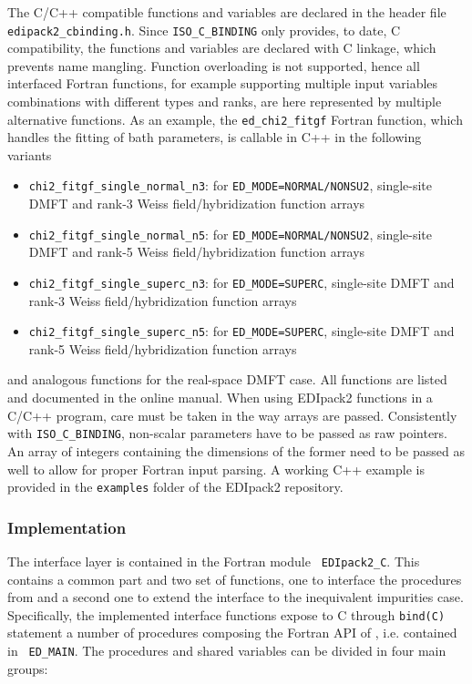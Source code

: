 \documentclass[edipack2.tex]{subfiles}
\begin{document}
The C/C++ compatible functions and variables 
are declared in the header file  {\tt edipack2\_cbinding.h}.
Since {\tt ISO\_C\_BINDING} only provides, to date, C compatibility, the 
functions and variables are declared with C linkage, which prevents name mangling.
Function overloading is not supported, hence all interfaced Fortran functions,
for example supporting multiple input variables combinations with different types
and ranks, are here represented by multiple alternative functions.
As an example, the {\tt ed\_chi2\_fitgf} Fortran function, which handles the fitting of bath parameters, is callable in C++ in the following variants
\begin{itemize}
    \item  {\tt chi2\_fitgf\_single\_normal\_n3}: for {\tt ED\_MODE=NORMAL/NONSU2}, single-site DMFT and rank-3 Weiss field/hybridization function arrays
    \item  {\tt chi2\_fitgf\_single\_normal\_n5}: for {\tt ED\_MODE=NORMAL/NONSU2}, single-site DMFT and rank-5 Weiss field/hybridization function arrays
    \item  {\tt chi2\_fitgf\_single\_superc\_n3}: for {\tt ED\_MODE=SUPERC}, single-site DMFT and rank-3 Weiss field/hybridization function arrays
    \item  {\tt chi2\_fitgf\_single\_superc\_n5}: for {\tt ED\_MODE=SUPERC}, single-site DMFT and rank-5 Weiss field/hybridization function arrays
\end{itemize}
and analogous functions for the real-space DMFT case. All functions are listed and documented in the online manual.
When using EDIpack2 functions in a C/C++ program, care must be taken in the way arrays are passed. Consistently with {\tt ISO\_C\_BINDING}, non-scalar parameters have to be passed as raw pointers. An array of integers containing the dimensions of the former need to be passed as well to allow for proper Fortran input parsing. A working C++ example is provided in the {\tt examples} folder of the EDIpack2 repository.

\subsubsection{Implementation}\label{sSecInteropCbindingsImplementation}
The interface layer is contained in the Fortran module {\tt
  EDIpack2\_C}. This contains a common part and two set of functions,
one to interface the procedures from \NAME and a second
one to extend the interface to the inequivalent impurities case.
Specifically, the implemented interface functions expose to C through
{\tt bind(C)} statement a number of
procedures composing the Fortran API of \NAME, i.e. contained in {\tt
  ED\_MAIN}. The procedures and shared variables can be divided in four main groups:
\end{document}
